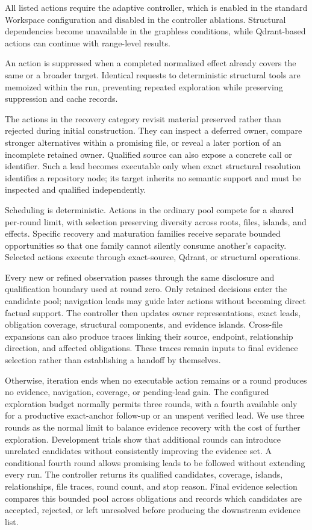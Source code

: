 
All listed actions require the adaptive controller, which is enabled in the standard Workspace configuration and disabled in the controller ablations. Structural dependencies become unavailable in the graphless conditions, while Qdrant-based actions can continue with range-level results.

An action is suppressed when a completed normalized effect already covers the same or a broader target. Identical requests to deterministic structural tools are memoized within the run, preventing repeated exploration while preserving suppression and cache records.

The actions in the recovery category revisit material preserved rather than rejected during initial construction. They can inspect a deferred owner, compare stronger alternatives within a promising file, or reveal a later portion of an incomplete retained owner. Qualified source can also expose a concrete call or identifier. Such a lead becomes executable only when exact structural resolution identifies a repository node; its target inherits no semantic support and must be inspected and qualified independently.

Scheduling is deterministic. Actions in the ordinary pool compete for a shared per-round limit, with selection preserving diversity across roots, files, islands, and effects. Specific recovery and maturation families receive separate bounded opportunities so that one family cannot silently consume another's capacity. Selected actions execute through exact-source, Qdrant, or structural operations.

Every new or refined observation passes through the same disclosure and qualification boundary used at round zero. Only retained decisions enter the candidate pool; navigation leads may guide later actions without becoming direct factual support. The controller then updates owner representations, exact leads, obligation coverage, structural components, and evidence islands. Cross-file expansions can also produce traces linking their source, endpoint, relationship direction, and affected obligations. These traces remain inputs to final evidence selection rather than establishing a handoff by themselves.

Otherwise, iteration ends when no executable action remains or a round produces no evidence, navigation, coverage, or pending-lead gain. The configured exploration budget normally permits three rounds, with a fourth available only for a productive exact-anchor follow-up or an unspent verified lead. We use three rounds as the normal limit to balance evidence recovery with the cost of further exploration. Development trials show that additional rounds can introduce unrelated candidates without consistently improving the evidence set. A conditional fourth round allows promising leads to be followed without extending every run. The controller returns its qualified candidates, coverage, islands, relationships, file traces, round count, and stop reason. Final evidence selection compares this bounded pool across obligations and records which candidates are accepted, rejected, or left unresolved before producing the downstream evidence list.

